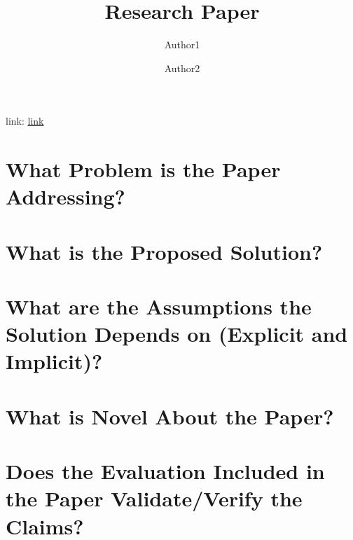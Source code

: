 \documentclass{article}
\title{Research Paper}
\author{
    Author1 \and
    Author2
}
\begin{document}
\maketitle

link: \href{}{link} 

\section{What Problem is the Paper Addressing?}

\section{What is the Proposed Solution?}

\section{What are the Assumptions the Solution Depends on (Explicit and Implicit)?}

\section{What is Novel About the Paper?}

\section{Does the Evaluation Included in the Paper Validate/Verify the Claims?}
\end{document}

